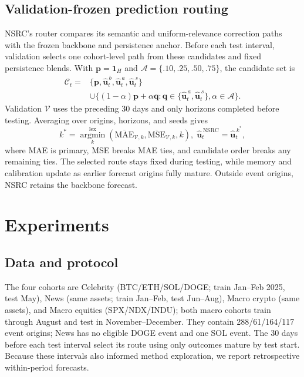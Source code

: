 \documentclass{article}
\begin{document}
\subsection{Validation-frozen prediction routing}
NSRC's router compares its semantic and uniform-relevance correction paths with the frozen backbone and persistence anchor. Before each test interval, validation selects one cohort-level path from these candidates and fixed persistence blends. With $\mathbf p=\mathbf1_H$ and $\mathcal A=\{.10,.25,.50,.75\}$, the candidate set is
\begin{equation}
\begin{aligned}
\mathcal C_t={}&\{\mathbf p,\hat{\mathbf u}^{\,b}_t,
                         \hat{\mathbf u}^{\,a}_t,\hat{\mathbf u}^{\,s}_t\}\\
 &\cup\{(1-\alpha)\mathbf p+\alpha\mathbf q:
       \mathbf q\in\{\hat{\mathbf u}^{\,a}_t,\hat{\mathbf u}^{\,s}_t\},
       \alpha\in\mathcal A\}.
\end{aligned}
\label{eq:candidates}
\end{equation}
Validation $\mathcal V$ uses the preceding 30 days and only horizons completed before testing. Averaging over origins, horizons, and seeds gives
\begin{equation}
k^*=\mathop{\arg\min}\limits_k^{\mathrm{lex}}(\overline{\mathrm{MAE}}_{\mathcal V,k},\overline{\mathrm{MSE}}_{\mathcal V,k},k),\;\hat{\mathbf u}^{\,\mathrm{NSRC}}_t=\hat{\mathbf u}^{\,k^*}_t,
\label{eq:route}
\end{equation}
where MAE is primary, MSE breaks MAE ties, and candidate order breaks any remaining ties. The selected route stays fixed during testing, while memory and calibration update as earlier forecast origins fully mature. Outside event origins, NSRC retains the backbone forecast.

\section{Experiments}



\subsection{Data and protocol}
The four cohorts are Celebrity (BTC/ETH/SOL/DOGE; train Jan--Feb 2025, test May), News (same assets; train Jan--Feb, test Jun--Aug), Macro crypto (same assets), and Macro equities (SPX/NDX/INDU); both macro cohorts train through August and test in November--December. They contain 288/61/164/117 event origins; News has no eligible DOGE event and one SOL event. The 30 days before each test interval select its route using only outcomes mature by test start. Because these intervals also informed method exploration, we report retrospective within-period forecasts.
\end{document}
